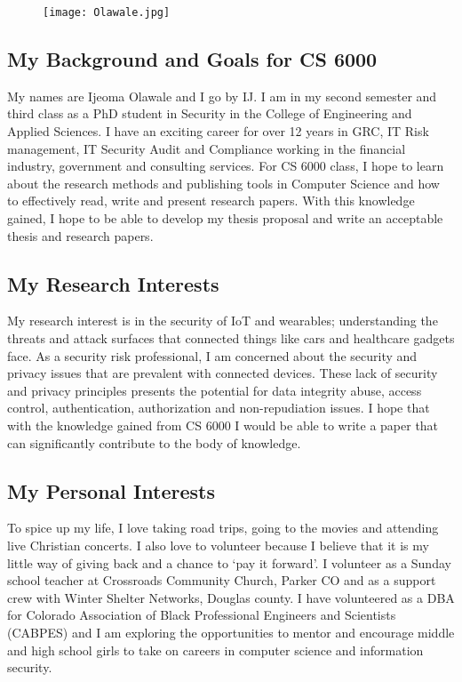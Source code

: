 \begin{figure}
\centering
\texttt{[image: Olawale.jpg]}
\end{figure}
\subsection{My Background and Goals for CS 6000}
My names are Ijeoma Olawale and I go by IJ. I am in my second semester and third class as a PhD student in Security in the College of Engineering and Applied Sciences. I have an exciting career for over 12 years in GRC, IT Risk management, IT Security Audit and Compliance working in the financial industry, government and consulting services. For CS 6000 class, I hope to learn about the research methods and publishing tools in Computer Science and how to effectively read, write and present research papers. With this knowledge gained, I hope to be able to develop my thesis proposal and write an acceptable thesis and research papers. 
\subsection{My Research Interests}
My research interest is in the security of IoT and wearables; understanding the threats and attack surfaces that connected things like cars and healthcare gadgets face. As a security risk professional, I am concerned about the security and privacy issues that are prevalent with connected devices. These lack of security and privacy principles presents the potential for data integrity abuse, access control, authentication, authorization and non-repudiation issues. I hope that with the knowledge gained from CS 6000 I would be able to write a paper that can significantly contribute to the body of knowledge.
\subsection{My Personal Interests}
To spice up my life, I love taking road trips, going to the movies and attending live Christian concerts. I also love to volunteer because I believe that it is my little way of giving back and a chance to ‘pay it forward’. I volunteer as a Sunday school teacher at Crossroads Community Church, Parker CO and as a support crew with Winter Shelter Networks, Douglas county. I have volunteered as a DBA for Colorado Association of Black Professional Engineers and Scientists (CABPES) and I am exploring the opportunities to mentor and encourage middle and high school girls to take on careers in computer science and information security.



